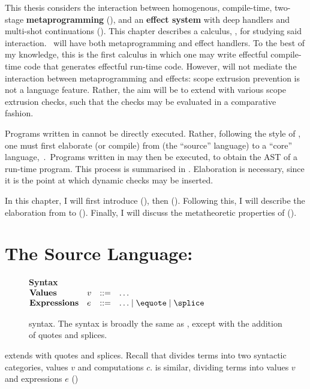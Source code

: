 This thesis considers the interaction between homogenous, compile-time, two-stage \textbf{metaprogramming} (), and an \textbf{effect system} with deep handlers and multi-shot continuations (). This chapter describes a calculus, \calculusName{}, for studying said interaction.\ \calculusName{} will have both metaprogramming and effect handlers. To the best of my knowledge, this is the first calculus in which one may write effectful compile-time code that generates effectful run-time code. However, \calculusName{} will not mediate the interaction between metaprogramming and effects: scope extrusion prevention is not a language feature. Rather, the aim will be to extend \calculusName{} with various scope extrusion checks, such that the checks may be evaluated in a comparative fashion. 

Programs written in \calculusName{} cannot be directly executed. Rather, following the style of \citet{xie-2023}, one must first elaborate (or compile) from \calculusName{} (the ``source'' language) to a ``core'' language,\, \coreLang{}.\, Programs written in \coreLang{} may then be executed, to obtain the AST of a run-time \efflang{} program. This process is summarised in . Elaboration is necessary, since it is the point at which dynamic checks may be inserted. 

In this chapter, I will first introduce \sourceLang{} (), then \coreLang{} (). Following this, I will describe the elaboration from \sourceLang{} to \coreLang{} (). Finally, I will discuss the metatheoretic properties of \calculusName{} (). 

\section{The Source Language: \texorpdfstring{\sourceLang{}}{Lambda-Op-Quote-Splice}}\label{section:source-lang}
\begin{figure}
\begin{source-desc}
  {\large \textbf{Syntax}} \\

  $\begin{array}{@{}llll}
    \textbf{Values} & v & ::= & \ldots \\
    \textbf{Expressions} & e & ::= & \ldots \mid \equote \mid \splice
  \end{array}$
\end{source-desc}
\caption{\sourceLang{} syntax. The syntax is broadly the same as \efflang{}, except with the addition of quotes and splices.}
\label{fig:source-syntax}
\end{figure}
\sourceLang{} extends \efflang{} with quotes and splices. Recall that \efflang{} divides terms into two syntactic categories, values $v$ and computations $c$. \sourceLang{} is similar, dividing terms into values $v$ and expressions $e$ ()

